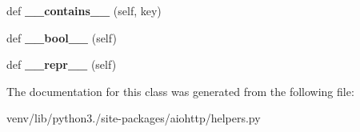\begin{DoxyCompactItemize}
def {\bfseries \+\_\+\+\_\+contains\+\_\+\+\_\+} (self, key)
\item 
\mbox{\label{classaiohttp_1_1helpers_1_1_chain_map_proxy_af7a75abd6313ce4d239c38623280643a}} 
def {\bfseries \+\_\+\+\_\+bool\+\_\+\+\_\+} (self)
\item 
\mbox{\label{classaiohttp_1_1helpers_1_1_chain_map_proxy_aa067c5fe9e095df4229d7897ee7e3703}} 
def {\bfseries \+\_\+\+\_\+repr\+\_\+\+\_\+} (self)
\end{DoxyCompactItemize}


The documentation for this class was generated from the following file\+:\begin{DoxyCompactItemize}
\item 
venv/lib/python3./site-\/packages/aiohttp/helpers.\+py\end{DoxyCompactItemize}
